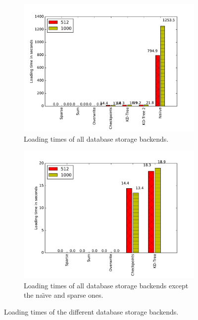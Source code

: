 \begin{figure}
\begin{subfigure}[t]{0.5\textwidth}
\centering
\includegraphics[width=\linewidth]{images/loading_time}
\caption{Loading times of all database storage backends.}
\label{fig:loading_all}
\end{subfigure}%
%
\begin{subfigure}[t]{0.5\textwidth}
\centering
\includegraphics[width=\linewidth]{images/loading_time_2}
\caption{Loading times of all database storage backends except the na\"{\i}ve and sparse ones.}
\label{fig:loading_except_naiive}
\end{subfigure}

\caption{Loading times of the different database storage backends.}
\end{figure}


